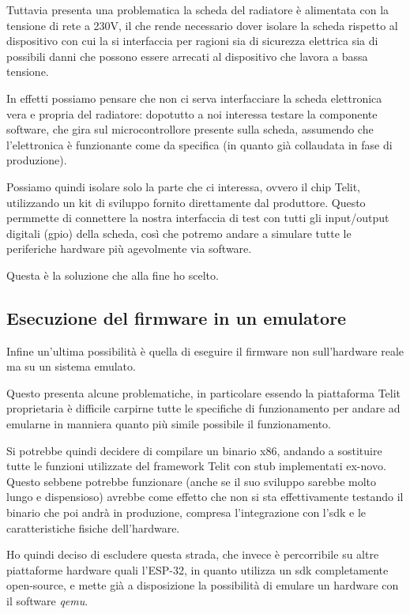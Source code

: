 \documentclass[12pt,a4paper,twoside,titlepage]{book}
\begin{document}
Tuttavia presenta una problematica la scheda del radiatore è alimentata con
la tensione di rete a 230V, il che rende necessario dover isolare la scheda rispetto
al dispositivo con cui la si interfaccia per ragioni sia di sicurezza elettrica sia
di possibili danni che possono essere arrecati al dispositivo che lavora a bassa tensione.

In effetti possiamo pensare che non ci serva interfacciare la scheda elettronica
vera e propria del radiatore: dopotutto a noi interessa testare la componente software,
che gira sul microcontrollore presente sulla scheda, assumendo che l'elettronica è
funzionante come da specifica (in quanto già collaudata in fase di produzione).

Possiamo quindi isolare solo la parte che ci interessa, ovvero il chip Telit, utilizzando
un kit di sviluppo fornito direttamente dal produttore. Questo permmette di connettere
la nostra interfaccia di test con tutti gli input/output digitali (\Gls{gpio}) della scheda,
così che potremo andare a simulare tutte le periferiche hardware più agevolmente via software.

Questa è la soluzione che alla fine ho scelto.

\subsection{Esecuzione del firmware in un emulatore}

Infine un'ultima possibilità è quella di eseguire il \gls{firmware} non sull'hardware
reale ma su un sistema emulato.

Questo presenta alcune problematiche, in particolare essendo la piattaforma Telit
proprietaria è difficile carpirne tutte le specifiche di funzionamento per andare
ad emularne in manniera quanto più simile possibile il funzionamento.

Si potrebbe quindi decidere di compilare un binario x86, andando a sostituire tutte
le funzioni utilizzate del framework Telit con stub implementati ex-novo. Questo
sebbene potrebbe funzionare (anche se il suo sviluppo sarebbe molto lungo e dispensioso)
avrebbe come effetto che non si sta effettivamente testando il binario che poi andrà
in produzione, compresa l'integrazione con l'\acrshort{sdk} e le caratteristiche fisiche dell'hardware.

Ho quindi deciso di escludere questa strada, che invece è percorribile su altre
piattaforme hardware quali l'ESP-32, in quanto utilizza un \acrshort{sdk} completamente open-source,
e mette già a disposizione la possibilità di emulare un hardware con il software \textit{qemu}.
\end{document}
